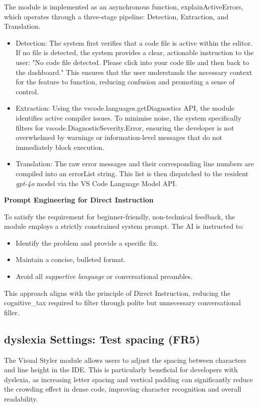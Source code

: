 The module is implemented as an asynchronous function, explainActiveErrors, which operates through a three-stage pipeline: Detection, Extraction, and Translation.
\begin{itemize}
    \item Detection: The system first verifies that a code file is active within the editor. If no file is detected, the system provides a clear, actionable 
instruction to the user: "No code file detected. Please click into your code file and then back to the dashboard." This ensures that the user understands 
the necessary context for the feature to function, reducing confusion and promoting a sense of control.
    \item Extraction: Using the vscode.languages.getDiagnostics \gls{API}, the module identifies active compiler issues. To minimise noise, 
    the system specifically filters for vscode.DiagnosticSeverity.Error, ensuring the developer is not overwhelmed by warnings or information-level 
    messages that do not immediately block execution.
    \item Translation: The raw error messages and their corresponding line numbers are compiled into an errorList string. 
This list is then dispatched to the resident \textit{gpt-4o} model via the VS Code Language Model \gls{API}.
\end{itemize}

\textbf{Prompt Engineering for Direct Instruction}


To satisfy the requirement for beginner-friendly, non-technical feedback, the module employs a strictly constrained system prompt. The \gls{AI} is instructed to:
\begin{itemize}
    \item Identify the problem and provide a specific fix.
    \item Maintain a concise, bulleted format.
    \item Avoid all \textit{supportive language} or conversational preambles.
\end{itemize}

This approach aligns with the principle of Direct Instruction, reducing the \gls{cognitive_tax} required to 
filter through polite but unnecessary conversational filler.

\subsection{\Gls{dyslexia} Settings: Test spacing (FR5)}
The Visual Styler module allows users to adjust the spacing between characters and line height in the \gls{IDE}. This is particularly beneficial for developers with \gls{dyslexia}, as increasing letter spacing 
and vertical padding can significantly reduce the crowding effect in dense code, improving character recognition and overall readability. 

